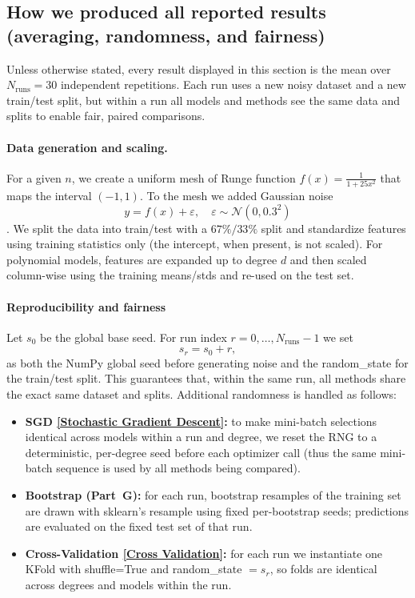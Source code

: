 \documentclass[
 reprint,            %
 amsmath,amssymb,
 aps,
]{revtex4-2}
\begin{document}
\subsection*{How we produced all reported results (averaging, randomness, and fairness)}
\label{sec:results_setup}
Unless otherwise stated, every result displayed in this section is the mean over $N_{\text{runs}}=30$ independent repetitions. Each run uses a new noisy dataset and a new train/test split, but within a run all models and methods see the same data and splits to enable fair, paired comparisons.

\paragraph*{Data generation and scaling.}
For a given $n$, we create a uniform mesh of Runge function $f(x)=\tfrac{1}{1+25x^2}$ that maps the interval $(-1,1)$. To the mesh we added Gaussian noise \[ y = f(x) + \varepsilon, \quad \varepsilon \sim \mathcal{N}(0, 0.3^2) \]. We split the data into train/test with a $67\%/33\%$ split and standardize features using training statistics only (the intercept, when present, is not scaled). For polynomial models, features are expanded up to degree $d$ and then scaled column-wise using the training means/stds and re-used on the test set.

\paragraph*{Reproducibility and fairness}
Let $s_0$ be the global base seed. For run index $r=0,\dots,N_{\text{runs}}-1$ we set
\[
s_r = s_0 + r,
\]
as both the NumPy global seed before generating noise and the random\_state for the train/test split. This guarantees that, within the same run, all methods share the exact same dataset and splits. Additional randomness is handled as follows:
\begin{itemize}
    \item \textbf{SGD \ref{Stochastic Gradient Descent}:} to make mini-batch selections identical across models within a run and degree, we reset the RNG to a deterministic, per-degree seed before each optimizer call (thus the same mini-batch sequence is used by all methods being compared).
    \item \textbf{Bootstrap (Part~G):} for each run, bootstrap resamples of the training set are drawn with sklearn's resample using fixed per-bootstrap seeds; predictions are evaluated on the fixed test set of that run.
    \item \textbf{Cross-Validation \ref{Cross Validation}:} for each run we instantiate one KFold with shuffle=True and random\_state $=s_r$, so folds are identical across degrees and models within the run.
\end{itemize}
\end{document}
